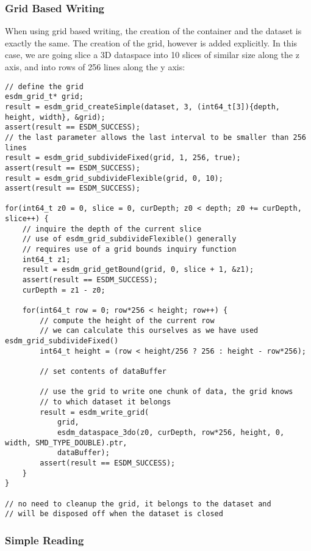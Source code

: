 \subsubsection{Grid Based Writing}%

When using grid based writing, the creation of the container and the
dataset is exactly the same. The creation of the grid, however is added
explicitly. In this case, we are going slice a 3D dataspace into 10
slices of similar size along the z axis, and into rows of 256 lines
along the y axis:

\begin{lstlisting}
// define the grid
esdm_grid_t* grid;
result = esdm_grid_createSimple(dataset, 3, (int64_t[3]){depth, height, width}, &grid);
assert(result == ESDM_SUCCESS);
// the last parameter allows the last interval to be smaller than 256 lines
result = esdm_grid_subdivideFixed(grid, 1, 256, true);  
assert(result == ESDM_SUCCESS);
result = esdm_grid_subdivideFlexible(grid, 0, 10);
assert(result == ESDM_SUCCESS);

for(int64_t z0 = 0, slice = 0, curDepth; z0 < depth; z0 += curDepth, slice++) {
    // inquire the depth of the current slice
    // use of esdm_grid_subdivideFlexible() generally 
    // requires use of a grid bounds inquiry function
    int64_t z1;
    result = esdm_grid_getBound(grid, 0, slice + 1, &z1);
    assert(result == ESDM_SUCCESS);
    curDepth = z1 - z0;

    for(int64_t row = 0; row*256 < height; row++) {
        // compute the height of the current row
        // we can calculate this ourselves as we have used esdm_grid_subdivideFixed()
        int64_t height = (row < height/256 ? 256 : height - row*256);

        // set contents of dataBuffer

        // use the grid to write one chunk of data, the grid knows 
        // to which dataset it belongs
        result = esdm_write_grid(
            grid, 
            esdm_dataspace_3do(z0, curDepth, row*256, height, 0, width, SMD_TYPE_DOUBLE).ptr, 
            dataBuffer);
        assert(result == ESDM_SUCCESS);
    }
}

// no need to cleanup the grid, it belongs to the dataset and 
// will be disposed off when the dataset is closed
\end{lstlisting}

\subsubsection{Simple Reading}%


